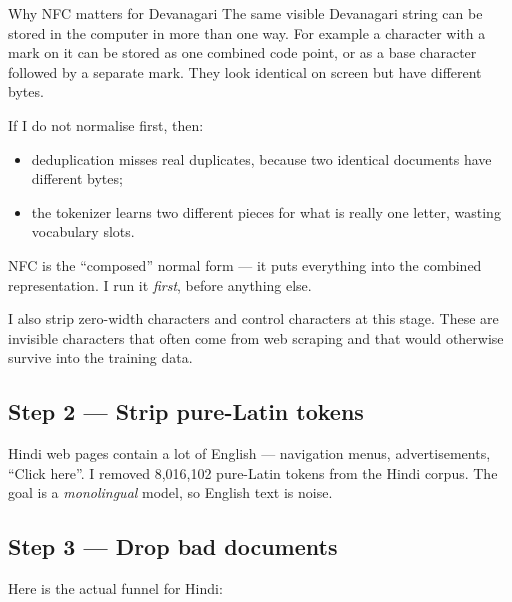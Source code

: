 \documentclass[11pt]{report}
\begin{document}
\begin{concept}{Why NFC matters for Devanagari}
The same visible Devanagari string can be stored in the computer in more than
one way. For example a character with a mark on it can be stored as one
combined code point, or as a base character followed by a separate mark. They
look identical on screen but have different bytes.

If I do not normalise first, then:
\begin{itemize}
\item deduplication misses real duplicates, because two identical documents have
      different bytes;
\item the tokenizer learns two different pieces for what is really one letter,
      wasting vocabulary slots.
\end{itemize}

NFC is the ``composed'' normal form --- it puts everything into the combined
representation. I run it \emph{first}, before anything else.
\end{concept}

I also strip zero-width characters and control characters at this stage. These
are invisible characters that often come from web scraping and that would
otherwise survive into the training data.

\subsection{Step 2 --- Strip pure-Latin tokens}

Hindi web pages contain a lot of English --- navigation menus, advertisements,
``Click here''. I removed 8,016,102 pure-Latin tokens from the Hindi corpus.
The goal is a \emph{monolingual} model, so English text is noise.

\subsection{Step 3 --- Drop bad documents}

Here is the actual funnel for Hindi:
\end{document}
